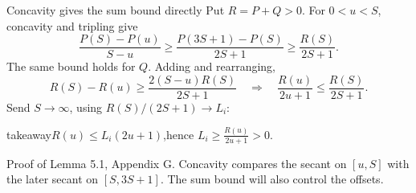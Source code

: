 \documentclass[aspectratio=169,11pt]{beamer}
\newcommand{\source}[1]{\vfill\par{\fontsize{7.5}{9}\selectfont\color{muted}#1\par}}
\newcommand{\takeaway}[1]{\begin{beamercolorbox}[sep=0.65em,wd=\linewidth]{takeaway}#1\end{beamercolorbox}}
\begin{document}
\begin{frame}{Concavity gives the sum bound directly}
  Put $R=P+Q>0$. For $0<u<S$, concavity and tripling give
  \[
    \frac{P(S)-P(u)}{S-u}
    \ge\frac{P(3S+1)-P(S)}{2S+1}
    \ge\frac{R(S)}{2S+1}.
  \]
  The same bound holds for $Q$. Adding and rearranging,
  \[
    R(S)-R(u)\ge\frac{2(S-u)R(S)}{2S+1}
    \quad\Longrightarrow\quad
    \frac{R(u)}{2u+1}\le\frac{R(S)}{2S+1}.
  \]
  Send $S\to\infty$, using $R(S)/(2S+1)\to L_i$:
  \takeaway{$\displaystyle R(u)\le L_i(2u+1)$,\quad hence
    $\displaystyle L_i\ge\frac{R(u)}{2u+1}>0$.}
  \source{Proof of Lemma 5.1, Appendix G.
  Concavity compares the secant on $[u,S]$ with the later secant on $[S,3S+1]$.
  The sum bound will also control the offsets.}
\end{frame}
\end{document}
